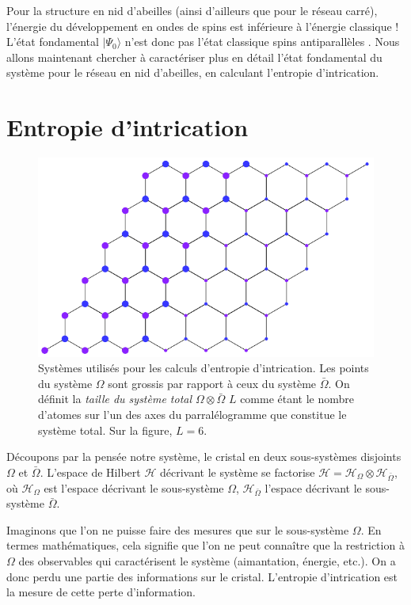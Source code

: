 \documentclass[a4paper, french]{report}
\newcommand{\fond}{\ensuremath{| \Psi_0 \rangle}\xspace}
\newcommand{\om}{\ensuremath{\Omega}\xspace}
\newcommand{\bom}{\ensuremath{\bar{\Omega}}\xspace}
\newcommand{\1}{\ensuremath{\ket{\om_1\bom_1}}\xspace}
\newcommand{\2}{\ensuremath{\ket{\om_2\bom_2}}\xspace}
\begin{document}
Pour la structure en nid d'abeilles (ainsi d'ailleurs que pour le réseau carré), l'énergie du développement en ondes de spins est inférieure à l'énergie classique ! L'état fondamental \fond n'est donc pas l'état classique \og spins antiparallèles \fg{}. Nous allons maintenant chercher à caractériser plus en détail l'état fondamental du système pour le réseau en nid d'abeilles, en calculant l'entropie d'intrication.

\chapter{Entropie d'intrication}

\begin{figure}[htp]
\centering
\includegraphics[scale=1.00]{vector_img/systeme_calculs.pdf}
\caption{Systèmes utilisés pour les calculs d'entropie d'intrication. Les points du système \om sont grossis par rapport à ceux du système \bom. On définit la \emph{taille du système total $\om \otimes\bom$} $L$ comme étant le nombre d'atomes sur l'un des axes du parralélogramme que constitue le système total. Sur la figure, $L=6$.}
\label{syst}
\end{figure}

Découpons par la pensée notre système, le cristal en deux sous-systèmes disjoints \om et \bom. L'espace de Hilbert $\mathcal{H}$ décrivant le système se factorise $\mathcal H=\mathcal H_{\om}\otimes\mathcal H_{\bom}$, où $\mathcal H_{\om}$ est l'espace décrivant le sous-système \om, $\mathcal H_{\bom}$ l'espace décrivant le sous-système \bom.

Imaginons que l'on ne puisse faire des mesures que sur le sous-système \om. En termes mathématiques, cela signifie que l'on ne peut connaître que la restriction à \om des observables qui caractérisent le système (aimantation, énergie, etc.). On a donc perdu une partie des informations sur le cristal. L'entropie d'intrication est la mesure de cette perte d'information.
\end{document}
